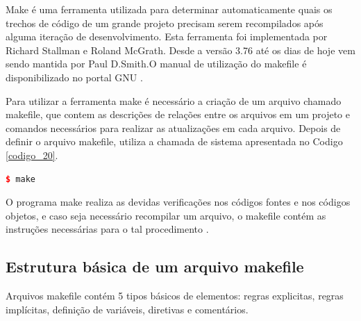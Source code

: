 Make é uma ferramenta utilizada para determinar automaticamente quais
 os trechos de código de um grande projeto precisam serem recompilados
 após alguma iteração de desenvolvimento. Esta ferramenta foi implementada
 por Richard Stallman e Roland McGrath. Desde a versão 3.76 até os dias de
 hoje vem sendo mantida por Paul D.Smith\cite{Lasca2}.O manual de utilização do makefile
 é disponibilizado no portal GNU \cite{ref45}.

Para utilizar a ferramenta make é necessário a criação de um arquivo chamado
 makefile, que contem as descrições de relações entre os arquivos em um projeto
 e comandos necessários para realizar as atualizações em cada arquivo\cite{Lasca2}.
 Depois de definir o arquivo makefile, utiliza a chamada de sistema apresentada 
no Codigo \ref{codigo_20}.

\begin{lstlisting}[language=C++,frame=single,title={Código 20: 
                             Chamada de Sistema para executar o programa make },
                                                label=codigo_20]
    $ make

\end{lstlisting}

O programa make realiza as devidas verificações nos códigos fontes e
 nos códigos objetos, e caso seja necessário recompilar um arquivo, o
 makefile contém as instruções necessárias para o tal procedimento \cite{ref46}.


\subsection{Estrutura básica de um arquivo makefile}

Arquivos makefile contém 5 tipos básicos de elementos: regras explicitas,
 regras implícitas, definição de variáveis, diretivas e comentários.

